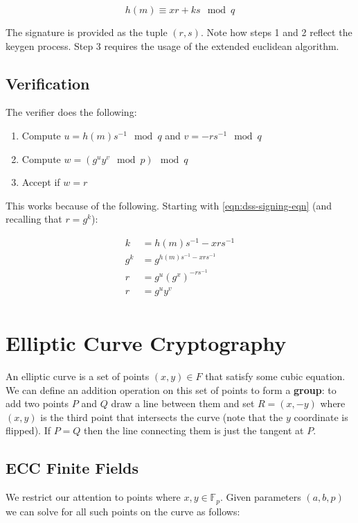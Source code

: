 \documentclass[11pt]{report}
\begin{document}
\begin{equation}
	\label{eqn:dss-signing-eqn}
	h(m) \equiv xr + ks \mod{q}
\end{equation}

The signature is provided as the tuple $(r, s)$. Note how steps 1 and 2 reflect the keygen process. Step 3 requires the usage of the extended euclidean algorithm.

\subsection{Verification}
The verifier does the following:

\begin{enumerate}
	\item Compute $u = h(m)s^{-1} \mod{q}$ and $v = -rs^{-1}\mod{q}$
	\item Compute $w = (g^uy^v \mod{p})\mod{q}$
	\item Accept if $w = r$
\end{enumerate}

This works because of the following. Starting with \autoref{eqn:dss-signing-eqn} (and recalling that $r = g^k$):

\begin{align*}
	k &= h(m)s^{-1} - xrs^{-1}\\
	g^k &= g^{h(m)s^{-1} - xrs^{-1}}\\
	r &= g^{u}(g^x)^{-rs^{-1}}\\
	r &= g^u y^v\\
\end{align*}

\section{Elliptic Curve Cryptography}

An elliptic curve is a set of points $(x, y) \in F$ that satisfy some cubic equation. We can define an addition operation on this set of points to form a \textbf{group}: to add two points $P$ and $Q$ draw a line between them and set $R = (x, -y)$ where $(x, y)$ is the third point that intersects the curve (note that the $y$ coordinate is flipped). If $P=Q$ then the line connecting them is just the tangent at $P$.

\subsection{ECC Finite Fields}
We restrict our attention to points where $x, y \in \mathbb{F}_p$. Given parameters $(a, b, p)$ we can solve for all such points on the curve as follows:
\end{document}
